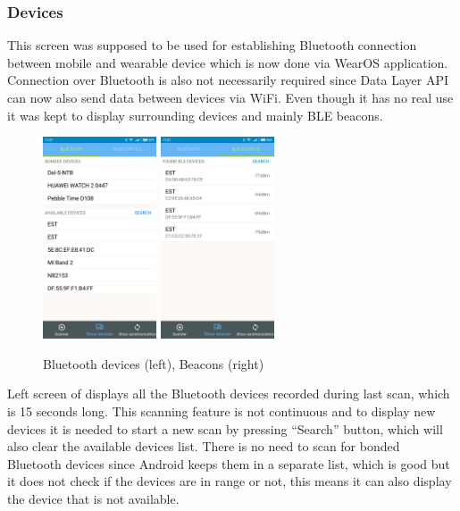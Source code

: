 \subsubsection{Devices}\label{subsec:Devices}
This screen was supposed to be used for establishing Bluetooth connection between mobile and wearable device which is now done via WearOS application. Connection over Bluetooth is also not necessarily required since Data Layer API can now also send data between devices via WiFi. Even though it has no real use it was kept to display surrounding devices and mainly BLE beacons.

\begin{figure}[h!]
	\begin{centering}
		\includegraphics[width=0.30\textwidth]{img/devices_bl}
		\hspace{0.2cm}
		\includegraphics[width=0.30\textwidth]{img/devices_ble}
		\par\end{centering}
	\caption{Bluetooth devices (left), Beacons (right)\label{fig:bl_ble_list}}
	\label{fig07c05}
\end{figure}

Left screen of  displays all the Bluetooth devices recorded during last scan, which is 15 seconds long. This scanning feature is not continuous and to display new devices it is needed to start a new scan by pressing \enquote{Search} button, which will also clear the available devices list. There is no need to scan for bonded Bluetooth devices since Android keeps them in a separate list, which is good but it does not check if the devices are in range or not, this means it can also display the device that is not available.

